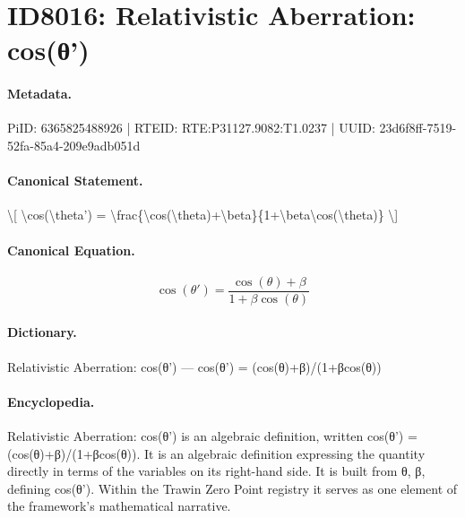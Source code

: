 \section*{ID8016: Relativistic Aberration: cos(θ')}
\paragraph{Metadata.}
PiID: 6365825488926 | RTEID: RTE:P31127.9082:T1.0237 | UUID: 23d6f8ff-7519-52fa-85a4-209e9adb051d

\paragraph{Canonical Statement.}
\textbackslash{}[ \textbackslash{}cos(\textbackslash{}theta') = \textbackslash{}frac\{\textbackslash{}cos(\textbackslash{}theta)+\textbackslash{}beta\}\{1+\textbackslash{}beta\textbackslash{}cos(\textbackslash{}theta)\} \textbackslash{}]

\paragraph{Canonical Equation.}
\[
\cos(\theta') = \frac{\cos(\theta)+\beta}{1+\beta\cos(\theta)}
\]

\paragraph{Dictionary.}
Relativistic Aberration: cos(θ') — cos(θ') = (cos(θ)+β)/(1+βcos(θ))

\paragraph{Encyclopedia.}
Relativistic Aberration: cos(θ') is an algebraic definition, written cos(θ') = (cos(θ)+β)/(1+βcos(θ)). It is an algebraic definition expressing the quantity directly in terms of the variables on its right-hand side. It is built from θ, β, defining cos(θ'). Within the Trawin Zero Point registry it serves as one element of the framework's mathematical narrative.
